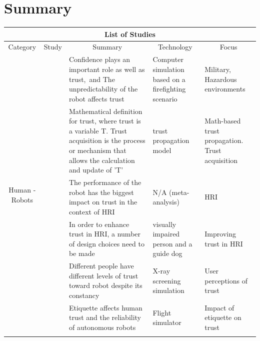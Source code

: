 \documentclass[runningheads,a4paper]{llncs}
\begin{document}
\section{Summary}

\begin{center}
\setlength\LTleft{0pt}
\setlength\LTright{0pt}
\begin{longtable}{|c|c|p{4cm}|p{2cm}|p{2cm}|}
\hline
\multicolumn{5}{|c|}{List of Studies}                                                                                               \\ \hline
Category                        & Study & \multicolumn{1}{c|}{Summary}    & \multicolumn{1}{c|}{Technology} & \multicolumn{1}{c|}{Focus} \\ \hline
\multirow{8}{*}{Human - Robots} 
	& \cite{stormont2008analyzing}    
	&  Confidence plays an important role as well as trust,\ and The unpredictability of the robot affects trust  
	& Computer simulation based on a firefighting scenario                        
	& Military, Hazardous environments
	\\ \cline{2-5} 
	& \cite{esfandiari2001agents}     
	& Mathematical definition for trust, where trust is a variable T. Trust acquisition is the process or mechanism that allows the calculation and update of 'T'
	& trust propagation model                      
	& Math-based trust propagation. Trust acquisition
	\\ \cline{2-5} 
	& \cite{hancock2011meta}
	& The performance of the robot has the biggest impact on trust in the context of HRI
	& N/A (meta-analysis)
	& HRI
	\\ \cline{2-5}
	&  \cite{penders2013enhancing}
	& In order to enhance trust in HRI, a number of design choices need to be made
	& visually impaired person and a guide dog
	& Improving trust in HRI
	\\ \cline{2-5} 
	& \cite{merritt2008not}
	& Different people have different levels of trust toward robot despite its constancy
	& X-ray screening simulation             
	& User perceptions of trust
	\\ \cline{2-5} 
	& \cite{parasuraman2004trust}
	& Etiquette affects human trust and the reliability of autonomous robots
	& Flight simulator
	& Impact of etiquette on trust
	\\ \cline{2-5} 
	& \cite{yagoda2012you}

\end{longtable}
\end{center}
\end{document}
